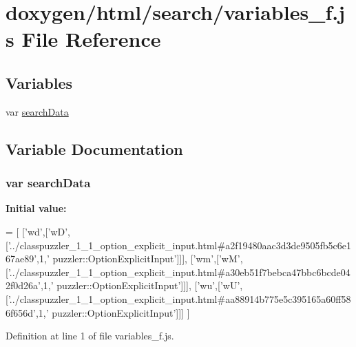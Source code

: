 \hypertarget{a00119}{}\section{doxygen/html/search/variables\+\_\+f.js File Reference}
\label{a00119}
\subsection*{Variables}
\begin{DoxyCompactItemize}
\item 
var \hyperlink{a00119_ad01a7523f103d6242ef9b0451861231e}{search\+Data}
\end{DoxyCompactItemize}


\subsection{Variable Documentation}
\hypertarget{a00119_ad01a7523f103d6242ef9b0451861231e}{}
\subsubsection[{search\+Data}]{\setlength{\rightskip}{0pt plus 5cm}var search\+Data}\label{a00119_ad01a7523f103d6242ef9b0451861231e}
{\bfseries Initial value\+:}
\begin{DoxyCode}
=
[
  [\textcolor{stringliteral}{'wd'},[\textcolor{stringliteral}{'wD'},[\textcolor{stringliteral}{'../classpuzzler\_1\_1\_option\_explicit\_input.html#a2f19480aac3d3de9505fb5c6e167ae89'},1,\textcolor{stringliteral}{'
      puzzler::OptionExplicitInput'}]]],
  [\textcolor{stringliteral}{'wm'},[\textcolor{stringliteral}{'wM'},[\textcolor{stringliteral}{'../classpuzzler\_1\_1\_option\_explicit\_input.html#a30eb51f7bebca47bbc6bcde042f0d26a'},1,\textcolor{stringliteral}{'
      puzzler::OptionExplicitInput'}]]],
  [\textcolor{stringliteral}{'wu'},[\textcolor{stringliteral}{'wU'},[\textcolor{stringliteral}{'../classpuzzler\_1\_1\_option\_explicit\_input.html#aa88914b775e5c395165a60ff586f656d'},1,\textcolor{stringliteral}{'
      puzzler::OptionExplicitInput'}]]]
]
\end{DoxyCode}


Definition at line 1 of file variables\+\_\+f.\+js.

